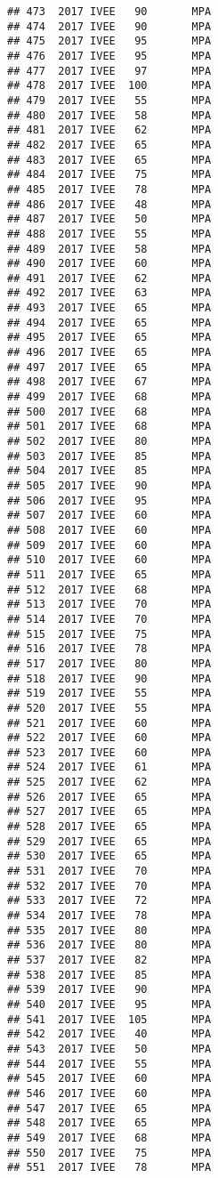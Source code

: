 \documentclass[]{article}
\begin{document}
\begin{verbatim}
## 473  2017 IVEE   90       MPA
## 474  2017 IVEE   90       MPA
## 475  2017 IVEE   95       MPA
## 476  2017 IVEE   95       MPA
## 477  2017 IVEE   97       MPA
## 478  2017 IVEE  100       MPA
## 479  2017 IVEE   55       MPA
## 480  2017 IVEE   58       MPA
## 481  2017 IVEE   62       MPA
## 482  2017 IVEE   65       MPA
## 483  2017 IVEE   65       MPA
## 484  2017 IVEE   75       MPA
## 485  2017 IVEE   78       MPA
## 486  2017 IVEE   48       MPA
## 487  2017 IVEE   50       MPA
## 488  2017 IVEE   55       MPA
## 489  2017 IVEE   58       MPA
## 490  2017 IVEE   60       MPA
## 491  2017 IVEE   62       MPA
## 492  2017 IVEE   63       MPA
## 493  2017 IVEE   65       MPA
## 494  2017 IVEE   65       MPA
## 495  2017 IVEE   65       MPA
## 496  2017 IVEE   65       MPA
## 497  2017 IVEE   65       MPA
## 498  2017 IVEE   67       MPA
## 499  2017 IVEE   68       MPA
## 500  2017 IVEE   68       MPA
## 501  2017 IVEE   68       MPA
## 502  2017 IVEE   80       MPA
## 503  2017 IVEE   85       MPA
## 504  2017 IVEE   85       MPA
## 505  2017 IVEE   90       MPA
## 506  2017 IVEE   95       MPA
## 507  2017 IVEE   60       MPA
## 508  2017 IVEE   60       MPA
## 509  2017 IVEE   60       MPA
## 510  2017 IVEE   60       MPA
## 511  2017 IVEE   65       MPA
## 512  2017 IVEE   68       MPA
## 513  2017 IVEE   70       MPA
## 514  2017 IVEE   70       MPA
## 515  2017 IVEE   75       MPA
## 516  2017 IVEE   78       MPA
## 517  2017 IVEE   80       MPA
## 518  2017 IVEE   90       MPA
## 519  2017 IVEE   55       MPA
## 520  2017 IVEE   55       MPA
## 521  2017 IVEE   60       MPA
## 522  2017 IVEE   60       MPA
## 523  2017 IVEE   60       MPA
## 524  2017 IVEE   61       MPA
## 525  2017 IVEE   62       MPA
## 526  2017 IVEE   65       MPA
## 527  2017 IVEE   65       MPA
## 528  2017 IVEE   65       MPA
## 529  2017 IVEE   65       MPA
## 530  2017 IVEE   65       MPA
## 531  2017 IVEE   70       MPA
## 532  2017 IVEE   70       MPA
## 533  2017 IVEE   72       MPA
## 534  2017 IVEE   78       MPA
## 535  2017 IVEE   80       MPA
## 536  2017 IVEE   80       MPA
## 537  2017 IVEE   82       MPA
## 538  2017 IVEE   85       MPA
## 539  2017 IVEE   90       MPA
## 540  2017 IVEE   95       MPA
## 541  2017 IVEE  105       MPA
## 542  2017 IVEE   40       MPA
## 543  2017 IVEE   50       MPA
## 544  2017 IVEE   55       MPA
## 545  2017 IVEE   60       MPA
## 546  2017 IVEE   60       MPA
## 547  2017 IVEE   65       MPA
## 548  2017 IVEE   65       MPA
## 549  2017 IVEE   68       MPA
## 550  2017 IVEE   75       MPA
## 551  2017 IVEE   78       MPA

\end{verbatim}
\end{document}
